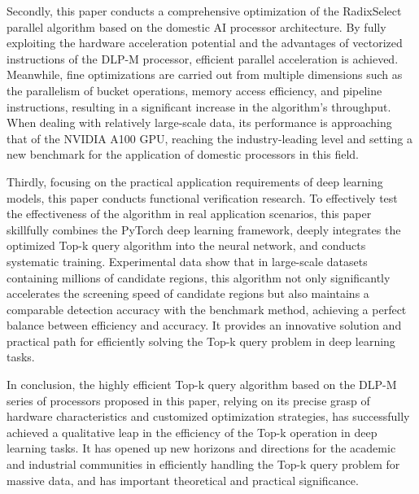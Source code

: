 \begin{abstract*}
  Secondly, this paper conducts a comprehensive optimization of the RadixSelect parallel algorithm based on the domestic AI processor architecture. By fully exploiting the hardware acceleration potential and the advantages of vectorized instructions of the DLP-M processor, efficient parallel acceleration is achieved. Meanwhile, fine optimizations are carried out from multiple dimensions such as the parallelism of bucket operations, memory access efficiency, and pipeline instructions, resulting in a significant increase in the algorithm's throughput. When dealing with relatively large-scale data, its performance is approaching that of the NVIDIA A100 GPU, reaching the industry-leading level and setting a new benchmark for the application of domestic processors in this field.
  
  Thirdly, focusing on the practical application requirements of deep learning models, this paper conducts functional verification research. To effectively test the effectiveness of the algorithm in real application scenarios, this paper skillfully combines the PyTorch deep learning framework, deeply integrates the optimized Top-k query algorithm into the neural network, and conducts systematic training. Experimental data show that in large-scale datasets containing millions of candidate regions, this algorithm not only significantly accelerates the screening speed of candidate regions but also maintains a comparable detection accuracy with the benchmark method, achieving a perfect balance between efficiency and accuracy. It provides an innovative solution and practical path for efficiently solving the Top-k query problem in deep learning tasks.
  
  In conclusion, the highly efficient Top-k query algorithm based on the DLP-M series of processors proposed in this paper, relying on its precise grasp of hardware characteristics and customized optimization strategies, has successfully achieved a qualitative leap in the efficiency of the Top-k operation in deep learning tasks. It has opened up new horizons and directions for the academic and industrial communities in efficiently handling the Top-k query problem for massive data, and has important theoretical and practical significance. 
\end{abstract*}
